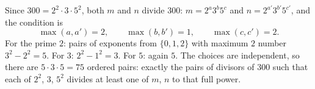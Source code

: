 Since $300=2^2\cdot3\cdot5^2$, both $m$ and $n$ divide $300$: $m=2^{a}3^{b}5^{c}$ and $n=2^{a'}3^{b'}5^{c'}$, and the condition is
\[\max(a,a')=2,\qquad\max(b,b')=1,\qquad\max(c,c')=2.\]
For the prime $2$: pairs of exponents from $\{0,1,2\}$ with maximum $2$ number $3^2-2^2=5$. For $3$: $2^2-1^2=3$. For $5$: again $5$. The choices are independent, so there are $5\cdot3\cdot5=\boxed{75}$ ordered pairs: exactly the pairs of divisors of $300$ such that each of $2^2$, $3$, $5^2$ divides at least one of $m$, $n$ to that full power.
